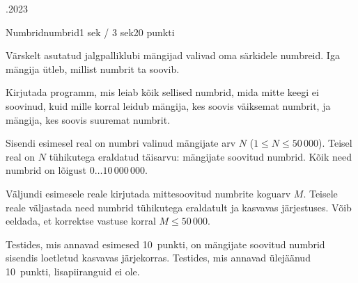 \documentclass[a4paper,11pt]{article}
\begin{document}
\begin{ol}{\eio}{.2023}{\yle}{}
\begin{yl}{2}{Numbrid}{numbrid}{1 sek / 3 sek}{20 punkti}

Värskelt asutatud jalgpalliklubi mängijad valivad oma särkidele numbreid. Iga mängija ütleb, millist numbrit ta soovib.

Kirjutada programm, mis leiab kõik sellised numbrid, mida mitte keegi ei soovinud, kuid mille korral leidub mängija, kes soovis väiksemat numbrit, ja mängija, kes soovis suuremat numbrit.

\sis 
Sisendi esimesel real on numbri valinud mängijate arv $N$ ($1 \le N \le 50\,000$).
Teisel real on $N$ tühikutega eraldatud täisarvu: mängijate soovitud numbrid. Kõik need numbrid on lõigust $0 \ldots 10\,000\,000$.

\val 
Väljundi esimesele reale kirjutada mittesoovitud numbrite koguarv $M$. Teisele reale väljastada need numbrid tühikutega eraldatult ja kasvavas järjestuses. Võib eeldada, et korrektse vastuse korral $M \le 50\,000$.

\nde[0]{4cm}{3cm}

\hnd Testides, mis annavad esimesed 10~punkti, on mängijate soovitud numbrid sisendis loetletud kasvavas järjekorras. Testides, mis annavad ülejäänud 10~punkti, lisapiiranguid ei ole.

\end{yl}
\end{ol}
\end{document}
